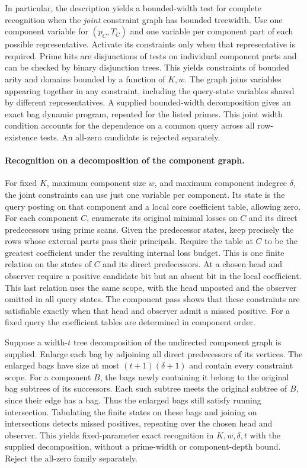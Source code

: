 In particular, the description yields a bounded-width
test for complete recognition when the \emph{joint}
constraint graph has bounded treewidth. Use one
component variable for $(p_C,T_C)$ and one variable
per component part of each possible representative.
Activate its constraints only when that representative
is required. Prime hits are disjunctions of tests on
individual component parts and can be checked by
binary disjunction trees. This yields constraints of
bounded arity and domains bounded by a function of
$K,w$. The graph joins variables appearing together
in any constraint, including the query-state variables
shared by different representatives. A supplied
bounded-width decomposition gives an exact bag
dynamic program, repeated for the listed primes.
This joint width condition accounts for the dependence
on a common query across all row-existence tests.
An all-zero candidate is rejected separately.

\paragraph{Recognition on a decomposition of the component graph.}
For fixed $K$, maximum component size $w$, and
maximum component indegree $\delta$, the joint
constraints can use just one variable per component.
Its state is the query posting on that component
and a local core coefficient table, allowing zero.
For each component $C$, enumerate its original
minimal losses on $C$ and its direct predecessors
using prime scans. Given the predecessor states,
keep precisely the rows whose external parts pass
their principals. Require the table at $C$ to be
the greatest coefficient under the resulting
internal loss budget. This is one finite relation
on the states of $C$ and its direct predecessors.
At a chosen head and observer require a positive
candidate bit but an absent bit in the local
coefficient. This last relation uses the same
scope, with the head unposted and the observer
omitted in all query states. The component pass
shows that these constraints are satisfiable
exactly when that head and observer admit a
missed positive. For a fixed query the coefficient
tables are determined in component order.

Suppose a width-$t$ tree decomposition of the
undirected component graph is supplied. Enlarge
each bag by adjoining all direct predecessors of
its vertices. The enlarged bags have size at most
$(t+1)(\delta+1)$ and contain every constraint
scope. For a component $B$, the bags newly
containing it belong to the original bag subtrees
of its successors. Each such subtree meets the
original subtree of $B$, since their edge has a
bag. Thus the enlarged bags still satisfy running
intersection. Tabulating the finite states on
these bags and joining on intersections detects
missed positives, repeating over the chosen head
and observer. This yields fixed-parameter exact
recognition in $K,w,\delta,t$ with the supplied
decomposition, without a prime-width or
component-depth bound. Reject the all-zero family
separately.

